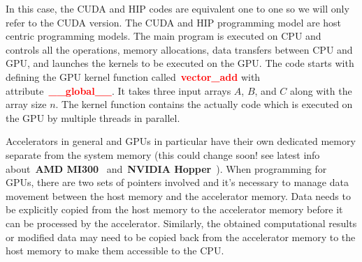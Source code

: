 











\par
In this case, the CUDA and HIP codes are equivalent one to one so we will only refer to the CUDA version.
The CUDA and HIP programming model are host centric programming models.
The main program is executed on CPU and controls all the operations, memory allocations, data transfers between CPU and GPU, and launches the kernels to be executed on the GPU.
The code starts with defining the GPU kernel function called~\textbf{\textcolor{red}{vector\_add}} with attribute~\textbf{\textcolor{red}{\_\_global\_\_}}.
It takes three input arrays $A$, $B$, and $C$ along with the array size $n$.
The kernel function contains the actually code which is executed on the GPU by multiple threads in parallel.


\par
Accelerators in general and GPUs in particular have their own dedicated memory separate from the system memory (this could change soon! see latest info about~\textbf{AMD MI300}~\cite{amd_mi300} and~\textbf{NVIDIA Hopper}~\cite{nvidia_hopper}).
When programming for GPUs, there are two sets of pointers involved and it’s necessary to manage data movement between the host memory and the accelerator memory.
Data needs to be explicitly copied from the host memory to the accelerator memory before it can be processed by the accelerator.
Similarly, the obtained computational results or modified data may need to be copied back from the accelerator memory to the host memory to make them accessible to the CPU.


